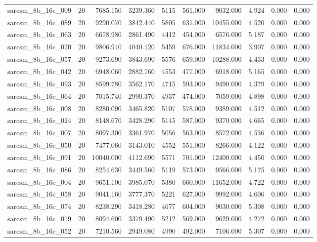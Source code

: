 \begin{tabular}{lrrrrrrrrr}
sarcsm\_8b\_16c\_009 & 20 & 7685.150 & 3239.360 & 5115 & 561.000 & 9032.000 & 4.924 & 0.000 & 0.000 \\
sarcsm\_8b\_16c\_089 & 20 & 9290.070 & 3842.440 & 5805 & 631.000 & 10455.000 & 4.520 & 0.000 & 0.000 \\
sarcsm\_8b\_16c\_063 & 20 & 6678.980 & 2861.490 & 4412 & 454.000 & 6576.000 & 5.187 & 0.000 & 0.000 \\
sarcsm\_8b\_16c\_020 & 20 & 9806.940 & 4040.120 & 5459 & 676.000 & 11834.000 & 3.907 & 0.000 & 0.000 \\
sarcsm\_8b\_16c\_057 & 20 & 9273.690 & 3843.690 & 5576 & 659.000 & 10288.000 & 4.433 & 0.000 & 0.000 \\
sarcsm\_8b\_16c\_042 & 20 & 6948.060 & 2882.760 & 4553 & 477.000 & 6918.000 & 5.165 & 0.000 & 0.000 \\
sarcsm\_8b\_16c\_093 & 20 & 8599.780 & 3562.170 & 4715 & 593.000 & 9490.000 & 4.379 & 0.000 & 0.000 \\
sarcsm\_8b\_16c\_064 & 20 & 7015.740 & 2990.370 & 4937 & 474.000 & 7059.000 & 4.898 & 0.000 & 0.000 \\
sarcsm\_8b\_16c\_008 & 20 & 8280.090 & 3465.820 & 5107 & 578.000 & 9389.000 & 4.512 & 0.000 & 0.000 \\
sarcsm\_8b\_16c\_024 & 20 & 8148.670 & 3428.290 & 5145 & 587.000 & 9370.000 & 4.665 & 0.000 & 0.000 \\
sarcsm\_8b\_16c\_007 & 20 & 8097.300 & 3361.970 & 5056 & 563.000 & 8572.000 & 4.536 & 0.000 & 0.000 \\
sarcsm\_8b\_16c\_050 & 20 & 7477.060 & 3143.010 & 4552 & 551.000 & 8266.000 & 4.122 & 0.000 & 0.000 \\
sarcsm\_8b\_16c\_091 & 20 & 10040.000 & 4112.690 & 5571 & 701.000 & 12400.000 & 4.450 & 0.000 & 0.000 \\
sarcsm\_8b\_16c\_086 & 20 & 8254.630 & 3449.560 & 5119 & 573.000 & 9566.000 & 5.175 & 0.000 & 0.000 \\
sarcsm\_8b\_16c\_004 & 20 & 9651.100 & 3985.070 & 5380 & 660.000 & 11652.000 & 4.722 & 0.000 & 0.000 \\
sarcsm\_8b\_16c\_058 & 20 & 9041.160 & 3777.370 & 5221 & 627.000 & 9992.000 & 4.606 & 0.000 & 0.000 \\
sarcsm\_8b\_16c\_074 & 20 & 8238.290 & 3418.280 & 4677 & 604.000 & 9030.000 & 5.308 & 0.000 & 0.000 \\
sarcsm\_8b\_16c\_019 & 20 & 8094.600 & 3379.490 & 5212 & 569.000 & 9629.000 & 4.272 & 0.000 & 0.000 \\
sarcsm\_8b\_16c\_052 & 20 & 7210.560 & 2949.080 & 4990 & 492.000 & 7106.000 & 5.307 & 0.000 & 0.000 \\

\end{tabular}

